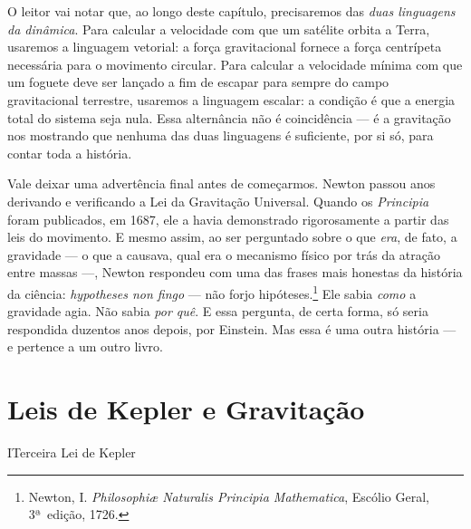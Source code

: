 O leitor vai notar que, ao longo deste capítulo, precisaremos das
\emph{duas linguagens da dinâmica}. Para calcular a velocidade com
que um satélite orbita a Terra, usaremos a linguagem vetorial: a
força gravitacional fornece a força centrípeta necessária para o
movimento circular. Para calcular a velocidade mínima com que um
foguete deve ser lançado a fim de escapar para sempre do campo
gravitacional terrestre, usaremos a linguagem escalar: a condição
é que a energia total do sistema seja nula. Essa alternância não
é coincidência --- é a gravitação nos mostrando que nenhuma das
duas linguagens é suficiente, por si só, para contar toda a história.
 
Vale deixar uma advertência final antes de começarmos. Newton
passou anos derivando e verificando a Lei da Gravitação Universal.
Quando os \emph{Principia} foram publicados, em 1687, ele a havia
demonstrado rigorosamente a partir das leis do movimento. E mesmo
assim, ao ser perguntado sobre o que \emph{era}, de fato, a
gravidade --- o que a causava, qual era o mecanismo físico por
trás da atração entre massas ---, Newton respondeu com uma das
frases mais honestas da história da ciência: \textit{hypotheses
non fingo} --- não forjo hipóteses.\footnote{Newton, I.
\textit{Philosophiæ Naturalis Principia Mathematica}, Escólio
Geral, 3ª~edição, 1726.} Ele sabia \emph{como} a gravidade agia.
Não sabia \emph{por quê}. E essa pergunta, de certa forma, só
seria respondida duzentos anos depois, por Einstein. Mas essa é
uma outra história --- e pertence a um outro livro.
 





















\section{Leis de Kepler e Gravitação}





\begin{secnivel}{I}{Terceira Lei de Kepler}
  

\end{secnivel}


